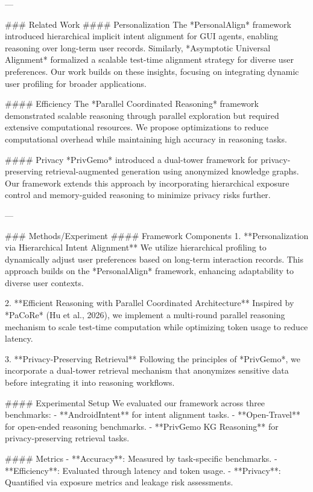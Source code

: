 ---

### Related Work  
#### Personalization  
The *PersonalAlign* framework introduced hierarchical implicit intent alignment for GUI agents, enabling reasoning over long-term user records. Similarly, *Asymptotic Universal Alignment* formalized a scalable test-time alignment strategy for diverse user preferences. Our work builds on these insights, focusing on integrating dynamic user profiling for broader applications.

#### Efficiency  
The *Parallel Coordinated Reasoning* framework demonstrated scalable reasoning through parallel exploration but required extensive computational resources. We propose optimizations to reduce computational overhead while maintaining high accuracy in reasoning tasks.

#### Privacy  
*PrivGemo* introduced a dual-tower framework for privacy-preserving retrieval-augmented generation using anonymized knowledge graphs. Our framework extends this approach by incorporating hierarchical exposure control and memory-guided reasoning to minimize privacy risks further.

---

### Methods/Experiment  
#### Framework Components  
1. **Personalization via Hierarchical Intent Alignment**  
   We utilize hierarchical profiling to dynamically adjust user preferences based on long-term interaction records. This approach builds on the *PersonalAlign* framework, enhancing adaptability to diverse user contexts.

2. **Efficient Reasoning with Parallel Coordinated Architecture**  
   Inspired by *PaCoRe* (Hu et al., 2026), we implement a multi-round parallel reasoning mechanism to scale test-time computation while optimizing token usage to reduce latency.

3. **Privacy-Preserving Retrieval**  
   Following the principles of *PrivGemo*, we incorporate a dual-tower retrieval mechanism that anonymizes sensitive data before integrating it into reasoning workflows.

#### Experimental Setup  
We evaluated our framework across three benchmarks:  
- **AndroidIntent** for intent alignment tasks.  
- **Open-Travel** for open-ended reasoning benchmarks.  
- **PrivGemo KG Reasoning** for privacy-preserving retrieval tasks.  

#### Metrics  
- **Accuracy**: Measured by task-specific benchmarks.  
- **Efficiency**: Evaluated through latency and token usage.  
- **Privacy**: Quantified via exposure metrics and leakage risk assessments.  

